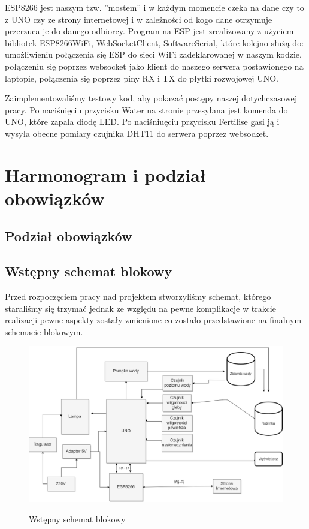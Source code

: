 \documentclass[12pt]{article}
\begin{document}
ESP8266 jest naszym tzw. ''mostem'' i w każdym momencie czeka na dane czy to z UNO czy ze strony internetowej i w zależności od kogo dane otrzymuje przerzuca je do danego odbiorcy.
Program na ESP jest zrealizowany z użyciem bibliotek ESP8266WiFi, WebSocketClient, SoftwareSerial, które kolejno służą do: umożliwieniu połączenia się ESP do sieci WiFi zadeklarowanej w naszym kodzie, połączeniu się poprzez websocket jako klient do naszego serwera postawionego na laptopie, połączenia się poprzez piny RX i TX do płytki rozwojowej UNO.

Zaimplementowaliśmy testowy kod, aby pokazać postępy naszej dotychczasowej pracy. Po naciśnięciu przycisku Water na stronie przesyłana jest komenda do UNO, które zapala diodę LED. Po naciśniuęciu przycisku Fertilise gasi ją i wysyła obecne pomiary czujnika DHT11 do serwera poprzez websocket.



\section{Harmonogram i podział obowiązków}

\subsection{Podział obowiązków}

\subsection{Wstępny schemat blokowy}
Przed rozpoczęciem pracy nad projektem stworzyliśmy schemat, którego staraliśmy się trzymać jednak ze względu na pewne komplikacje w trakcie realizacji pewne aspekty zostały zmienione co zostało przedstawione na finalnym schemacie blokowym.
\begin{figure}[!h]
	\begin{center}
		{\includegraphics[width=16cm]{schemat_blokowy.png}}
	\end{center}
	\caption{Wstępny schemat blokowy}
\end{figure}
\end{document}
